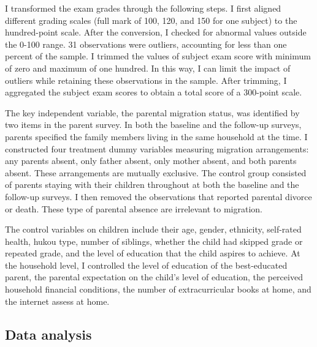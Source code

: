 \documentclass[
  man,floatsintext]{apa7}
\begin{document}
I transformed the exam grades through the following steps. I first aligned different grading scales (full mark of 100, 120, and 150 for one subject) to the hundred-point scale. After the conversion, I checked for abnormal values outside the 0-100 range. 31 observations were outliers, accounting for less than one percent of the sample. I trimmed the values of subject exam score with minimum of zero and maximum of one hundred. In this way, I can limit the impact of outliers while retaining these observations in the sample. After trimming, I aggregated the subject exam scores to obtain a total score of a 300-point scale.

The key independent variable, the parental migration status, was identified by two items in the parent survey. In both the baseline and the follow-up surveys, parents specified the family members living in the same household at the time. I constructed four treatment dummy variables measuring migration arrangements: any parents absent, only father absent, only mother absent, and both parents absent. These arrangements are mutually exclusive. The control group consisted of parents staying with their children throughout at both the baseline and the follow-up surveys. I then removed the observations that reported parental divorce or death. These type of parental absence are irrelevant to migration.

The control variables on children include their age, gender, ethnicity, self-rated health, hukou type, number of siblings, whether the child had skipped grade or repeated grade, and the level of education that the child aspires to achieve. At the household level, I controlled the level of education of the best-educated parent, the parental expectation on the child's level of education, the perceived household financial conditions, the number of extracurricular books at home, and the internet assess at home.

\hypertarget{data-analysis}{%
\subsection{Data analysis}\label{data-analysis}}
\end{document}
